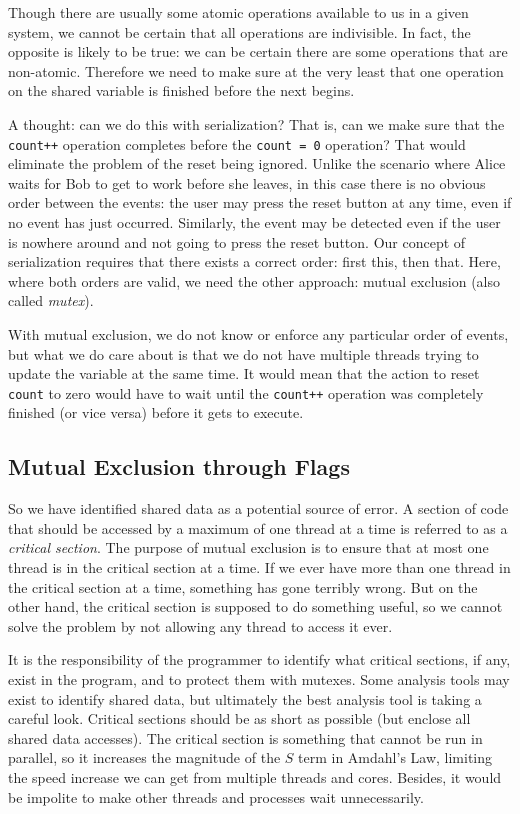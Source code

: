 Though there are usually some atomic operations available to us in a given system, we cannot be certain that all operations are indivisible. In fact, the opposite is likely to be true: we can be certain there are some operations that are non-atomic. Therefore we need to make sure at the very least that one operation on the shared variable is finished before the next begins.

A thought: can we do this with serialization? That is, can we make sure that the \texttt{count++} operation completes before the \texttt{count = 0} operation? That would eliminate the problem of the reset being ignored. Unlike the scenario where Alice waits for Bob to get to work before she leaves, in this case there is no obvious order between the events: the user may press the reset button at any time, even if no event has just occurred. Similarly, the event may be detected even if the user is nowhere around and not going to press the reset button. Our concept of serialization requires that there exists a correct order: first this, then that. Here, where both orders are valid, we need the other approach: mutual exclusion (also called \textit{mutex}).

With mutual exclusion, we do not know or enforce any particular order of events, but what we do care about is that we do not have multiple threads trying to update the variable at the same time. It would mean that the action to reset \texttt{count} to zero would have to wait until the \texttt{count++} operation was completely finished (or vice versa) before it gets to execute. 

\subsection*{Mutual Exclusion through Flags}
So we have identified shared data as a potential source of error. A section of code that should be accessed by a maximum of one thread at a time is referred to as a \textit{critical section}. The purpose of mutual exclusion is to ensure that at most one thread is in the critical section at a time. If we ever have more than one thread in the critical section at a time, something has gone terribly wrong. But on the other hand, the critical section is supposed to do something useful, so we cannot solve the problem by not allowing any thread to access it ever.

It is the responsibility of the programmer to identify what critical sections, if any, exist in the program, and to protect them with mutexes. Some analysis tools may exist to identify shared data, but ultimately the best analysis tool is taking a careful look. Critical sections should be as short as possible (but enclose all shared data accesses). The critical section is something that cannot be run in parallel, so it increases the magnitude of the $S$ term in Amdahl's Law, limiting the speed increase we can get from multiple threads and cores. Besides, it would be impolite to make other threads and processes wait unnecessarily.

